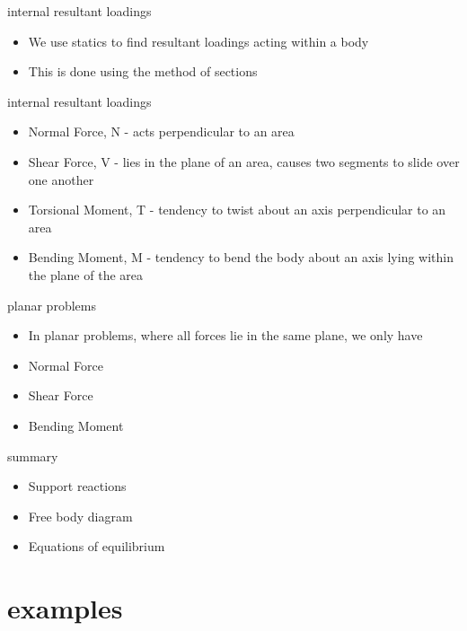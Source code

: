 \documentclass[12pt,handout]{beamer}
\providecommand{\tightlist}{%
  \setlength{\itemsep}{0pt}\setlength{\parskip}{0pt}}
\providecommand{\tightlist}{%
\setlength{\itemsep}{0pt}\setlength{\parskip}{0pt}}
\begin{document}
\begin{frame}{internal resultant loadings}
\protect\hypertarget{internal-resultant-loadings}{}
\begin{itemize}
\tightlist
\item
  We use statics to find resultant loadings acting within a body
\item
  This is done using the method of sections
\end{itemize}
\end{frame}

\begin{frame}{internal resultant loadings}
\protect\hypertarget{internal-resultant-loadings-1}{}
\begin{itemize}
\tightlist
\item
  Normal Force, N - acts perpendicular to an area
\item
  Shear Force, V - lies in the plane of an area, causes two segments to
  slide over one another
\item
  Torsional Moment, T - tendency to twist about an axis perpendicular to
  an area
\item
  Bending Moment, M - tendency to bend the body about an axis lying
  within the plane of the area
\end{itemize}
\end{frame}

\begin{frame}{planar problems}
\protect\hypertarget{planar-problems}{}
\begin{itemize}
\tightlist
\item
  In planar problems, where all forces lie in the same plane, we only
  have
\item
  Normal Force
\item
  Shear Force
\item
  Bending Moment
\end{itemize}
\end{frame}

\begin{frame}{summary}
\protect\hypertarget{summary}{}
\begin{itemize}
\tightlist
\item
  Support reactions
\item
  Free body diagram
\item
  Equations of equilibrium
\end{itemize}
\end{frame}

\hypertarget{examples}{%
\section{examples}\label{examples}}
\end{document}
